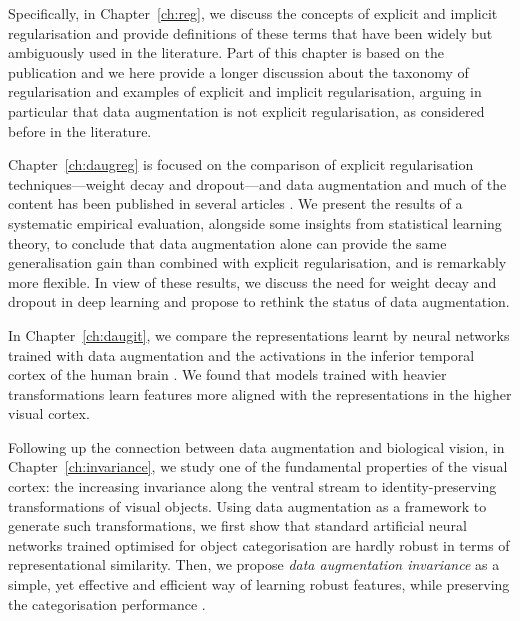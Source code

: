{Specifically, in Chapter~\ref{ch:reg}, we discuss the concepts of explicit and implicit regularisation and provide definitions of these terms that have been widely but ambiguously used in the literature. Part of this chapter is based on the publication \citep{hergar2018daugreg} and we here provide a longer discussion about the taxonomy of regularisation and examples of explicit and implicit regularisation, arguing in particular that data augmentation is not explicit regularisation, as considered before in the literature.

Chapter~\ref{ch:daugreg} is focused on the comparison of explicit regularisation techniques---weight decay and dropout---and data augmentation and much of the content has been published in several articles \citep{hergar2018daugadvantages, hergar2018daugreg, hergar2018wddropout}. We present the results of a systematic empirical evaluation, alongside some insights from statistical learning theory, to conclude that data augmentation alone can provide the same generalisation gain than combined with explicit regularisation, and is remarkably more flexible. In view of these results, we discuss the need for weight decay and dropout in deep learning and propose to rethink the status of data augmentation.

In Chapter~\ref{ch:daugit}, we compare the representations learnt by neural networks trained with data augmentation and the activations in the inferior temporal cortex of the human brain \citep{hergar2018daugit}. We found that models trained with heavier transformations learn features more aligned with the representations in the higher visual cortex.

Following up the connection between data augmentation and biological vision, in Chapter~\ref{ch:invariance}, we study one of the fundamental properties of the visual cortex: the increasing invariance along the ventral stream to identity-preserving transformations of visual objects. Using data augmentation as a framework to generate such transformations, we first show that standard artificial neural networks trained optimised for object categorisation are hardly robust in terms of representational similarity. Then, we propose \textit{data augmentation invariance} as a simple, yet effective and efficient way of learning robust features, while preserving the categorisation performance \citep{hergar2019dauginv}.

}

